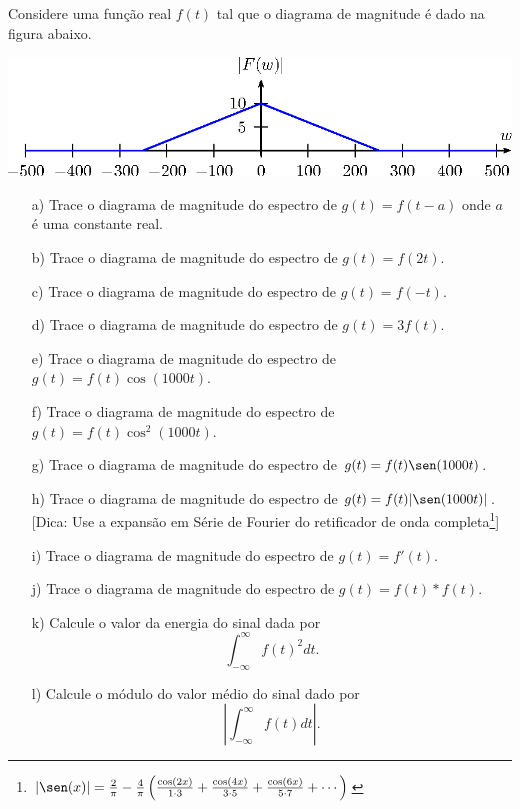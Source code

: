 \begin{exer}Considere uma função real $f(t)$ tal que o diagrama de magnitude é dado na figura abaixo. 
    \begin{center}
    \includegraphics{cap_propriedades_transformada/pics/figura_13}\end{center}
    \begin{itemize}
    \item[a)] Trace o diagrama de magnitude do espectro de $g(t)=f(t-a)$ onde $a$ é uma constante real.
    \item[b)] Trace o diagrama de magnitude do espectro de $g(t)=f(2t)$.
    \item[c)] Trace o diagrama de magnitude do espectro de $g(t)=f(-t)$.
    \item[d)] Trace o diagrama de magnitude do espectro de $g(t)=3f(t)$.
    \item[e)] Trace o diagrama de magnitude do espectro de $g(t)=f(t)\cos(1000t)$.
    \item[f)] Trace o diagrama de magnitude do espectro de $g(t)=f(t)\cos^2(1000t)$.
    \item[g)] Trace o diagrama de magnitude do espectro de $g(t)=f(t)\sen(1000t)$.
    \item[h)] Trace o diagrama de magnitude do espectro de $g(t)=f(t)|\sen(1000t)|$. [Dica: Use a expansão em Série de Fourier do retificador de onda completa\footnote{$|\sen(x)|=\frac{2}{\pi}-\frac{4}{\pi}\left(\frac{\cos(2x)}{1\cdot 3}+\frac{\cos(4x)}{3\cdot 5}+\frac{\cos(6x)}{5\cdot 7}+\cdots\right)$}]
    \item[i)] Trace o diagrama de magnitude do espectro de $g(t)=f'(t)$.
    \item[j)] Trace o diagrama de magnitude do espectro de $g(t)=f(t)\ast f(t)$.
    \item[k)] Calcule o valor da energia do sinal dada por \begin{equation}\int_{-\infty}^\infty f(t)^2dt.\end{equation}
    \item[l)] Calcule o módulo do valor médio do sinal dado por \begin{equation}\left|\int_{-\infty}^\infty f(t)dt\right|.\end{equation}
    \end{itemize}
     \end{exer}
